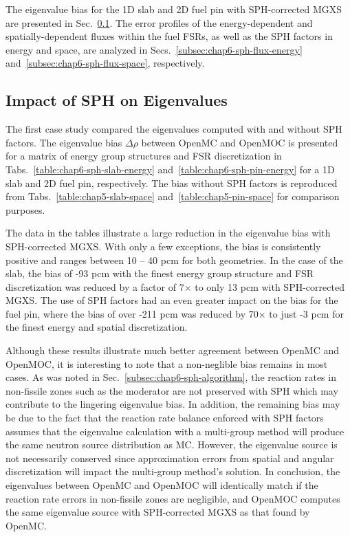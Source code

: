 The eigenvalue bias for the 1D slab and 2D fuel pin with \ac{SPH}-corrected \ac{MGXS} are presented in Sec.~\ref{subsubsec:chap6-sph-eigenvalues}. The error profiles of the energy-dependent and spatially-dependent fluxes within the fuel \ac{FSR}s, as well as the \ac{SPH} factors in energy and space, are analyzed in Secs.~\ref{subsec:chap6-sph-flux-energy} and~\ref{subsec:chap6-sph-flux-space}, respectively.

\subsection{Impact of SPH on Eigenvalues}
\label{subsubsec:chap6-sph-eigenvalues}

The first case study compared the eigenvalues computed with and without \ac{SPH} factors. The eigenvalue bias $\Delta\rho$ between OpenMC and OpenMOC is presented for a matrix of energy group structures and \ac{FSR} discretization in Tabs.~\ref{table:chap6-sph-slab-energy} and~\ref{table:chap6-sph-pin-energy} for a 1D slab and 2D fuel pin, respectively. The bias without \ac{SPH} factors is reproduced from Tabs.~\ref{table:chap5-slab-space} and~\ref{table:chap5-pin-space} for comparison purposes.

The data in the tables illustrate a large reduction in the eigenvalue bias with \ac{SPH}-corrected \ac{MGXS}. With only a few exceptions, the bias is consistently positive and ranges between 10 -- 40 \ac{pcm} for both geometries. In the case of the slab, the bias of -93 \ac{pcm} with the finest energy group structure and \ac{FSR} discretization was reduced by a factor of 7$\times$ to only 13 \ac{pcm} with \ac{SPH}-corrected \ac{MGXS}. The use of \ac{SPH} factors had an even greater impact on the bias for the fuel pin, where the bias of over -211 \ac{pcm} was reduced by 70$\times$ to just -3 \ac{pcm} for the finest energy and spatial discretization. 

Although these results illustrate much better agreement between OpenMC and OpenMOC, it is interesting to note that a non-neglible bias remains in most cases. As was noted in Sec.~\ref{subsec:chap6-sph-algorithm}, the reaction rates in non-fissile zones such as the moderator are not preserved with \ac{SPH} which may contribute to the lingering eigenvalue bias. In addition, the remaining bias may be due to the fact that the reaction rate balance enforced with \ac{SPH} factors assumes that the eigenvalue calculation with a multi-group method will produce the same neutron source distribution as \ac{MC}. However, the eigenvalue source is not necessarily conserved since approximation errors from spatial and angular discretization will impact the multi-group method's solution. In conclusion, the eigenvalues between OpenMC and OpenMOC will identically match if the reaction rate errors in non-fissile zones are negligible, and OpenMOC computes the same eigenvalue source with \ac{SPH}-corrected \ac{MGXS} as that found by OpenMC.

